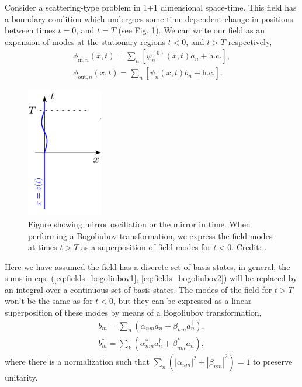 \newpage\noindent
Consider a scattering-type problem in 1+1 dimensional space-time. This field has a boundary condition which undergoes some time-dependent change in positions between times $t=0$, and $t=T$ (see Fig. \ref{fig:Nation_transformation}). We can write our field as an expansion of modes at the stationary regions $t<0$, and $t>T$ respectively,
%
\begin{gather}
    \phi_{\text{in}, n}(x,t) = \sum_n \left[ \psi_n^{(0)}(x,t)a_n + \text{h.c.}\right],\label{eq:fields_bogoliubov1}
    \\
    \phi_{\text{out}, n}(x,t) = \sum_n \left[ \psi_n(x,t)b_n + \text{h.c.}\right].\label{eq:fields_bogoliubov2}
\end{gather}
%
\begin{figure}
    \centering
    \includegraphics[width=1.3in, keepaspectratio]{figures/intro/Nation2011_transformation.png}
    \caption{Figure showing mirror oscillation or the mirror in time. When performing a Bogoliubov transformation, we express the field modes at times $t>T$ as a superposition of field modes for $t<0$. Credit: \protect\cite{Nation2011}.}
    \label{fig:Nation_transformation}
\end{figure}
%
Here we have assumed the field has a discrete set of basis states, in general, the sums in eqs. (\ref{eq:fields_bogoliubov1}, \ref{eq:fields_bogoliubov2}) will be replaced by an integral over a continuous set of basis states. The modes of the field for $t>T$ won't be the same as for $t<0$, but they can be expressed as a linear superposition of these modes by means of a Bogoliubov transformation,
%
\begin{equation}\label{eq:bogoliubov_trans}
    \begin{split}
    b_m = \sum_n \left(\alpha_{nm}a_n + \beta_{nm} a_n^{\dagger} \right),
    \\
    b_m^{\dagger} = \sum_k \left(\alpha_{nm}^* a_n^{\dagger} + \beta_{nm}^* a_n \right),
    \end{split}
\end{equation}
%
where there is a normalization such that $\sum_n \left(|\alpha_{nm}|^2 + |\beta_{nm}|^2\right) = 1$ to preserve unitarity.

